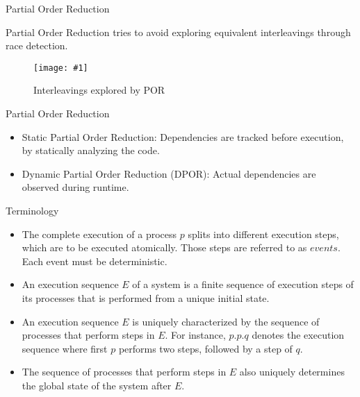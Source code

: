 \documentclass[9pt]{beamer}
\newcommand{\trace}[2]{
\begin{figure}[H]
\centering
\texttt{[image: \#1]}
\caption{#2}
\label{#2}
\end{figure}
}
\begin{document}
\begin{frame} {Partial Order Reduction}

Partial Order Reduction tries to avoid exploring equivalent interleavings through race detection.

\trace{../img/initpor.png}{Interleavings explored by POR}

\end{frame}

\begin{frame} {Partial Order Reduction}
\begin{itemize}[<+->]
    \item Static Partial Order Reduction: Dependencies are tracked before execution, by statically analyzing the code.
    \item Dynamic Partial Order Reduction (DPOR): Actual dependencies are observed during runtime.
\end{itemize}

\end{frame}


\begin{frame} {Terminology}

\begin{itemize}[<+->]
    \item The complete execution of a process $p$ splits into different execution steps, which are
    to be executed atomically. Those steps are referred to as $events$. Each event must be deterministic.
    \item An execution sequence $E$ of a system is a finite sequence of execution steps
    of its processes that is performed from a unique initial state.
    \item An execution sequence $E$ is uniquely characterized by the sequence of processes
    that perform steps in $E$. For instance, $p.p.q$ denotes the execution
    sequence where first $p$ performs two steps, followed by a step of $q$.
    \item The sequence of processes that perform steps in $E$ also uniquely
    determines the global state of the system after $E$.
\end{itemize}

\end{frame}
\end{document}
